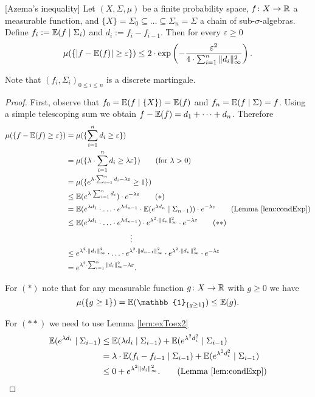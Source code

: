 \begin{lemma}\label{lem:azema}[Azema's inequality]
Let $(X,\Sigma,\mu)$ be a finite probability space, $f\colon X\to\mathbb{R}$ a measurable function, and $\{X\}=\Sigma_0\subseteq\dots\subseteq\Sigma_n=\Sigma$ a chain of sub-$\sigma$-algebras. Define $f_i:=\mathbb{E}(f\mid\Sigma_i)$ and $d_i:=f_i-f_{i-1}$. Then for every $\varepsilon\geq0$
\[\mu(\{|f-\mathbb{E}(f)|\geq \varepsilon\})\leq 2\cdot\exp\left(-\frac{\varepsilon^2}{4\cdot\sum_{i=1}^{n}\|d_i\|^2_\infty}\right).\]
\end{lemma}
Note that $(f_i,\Sigma_i)_{0\leq i\leq n}$ is a discrete martingale. 
\begin{proof} First, observe that $f_0=\mathbb{E}(f\mid \{X\})=\mathbb{E}(f)$ and $f_n=\mathbb{E}(f\mid\Sigma)=f$. Using a simple telescoping sum we obtain $f-\mathbb{E}(f)=d_1+\dots+d_n$. Therefore
\begin{align*}
\mu(\{f-\E(f)\geq \varepsilon\})&=\mu(\{\sum_{i=1}^{n}d_i\geq  \varepsilon\})\\
&=\mu(\{\lambda\cdot\sum_{i=1}^{n}d_i\geq \lambda \varepsilon\})\tag{for $\lambda>0$}\\
&=\mu(\{e^{\lambda\cdot\sum_{i=1}^{n}d_i-\lambda \varepsilon}\geq 1\})\\
&\leq\E(e^{\lambda\cdot\sum_{i=1}^{n}d_i})\cdot e^{-\lambda \varepsilon}\tag{$\ast$}\\
&=\E(e^{\lambda d_1}\cdot\ldots\cdot e^{\lambda d_{n-1}}\cdot\E(e^{\lambda d_n}\mid \Sigma_{n-1}))\cdot e^{-\lambda \varepsilon}\tag{Lemma \ref{lem:condExp}}\\
&\leq\E(e^{\lambda d_1}\cdot\ldots\cdot e^{\lambda d_{n-1}})\cdot e^{\lambda^2\cdot \|d_n\|^2_\infty}\cdot e^{-\lambda \varepsilon}\tag{$\ast\ast$}\\
&\hspace{3cm}\vdots\\
&\leq e^{\lambda^2\cdot \|d_1\|^2_\infty}\cdot\ldots\cdot e^{\lambda^2\cdot \|d_{n-1}\|^2_\infty}\cdot e^{\lambda^2\cdot \|d_n\|^2_\infty}\cdot e^{-\lambda \varepsilon}\\
&=e^{\lambda^2\cdot\sum_{i=1}^n\|d_i\|^2_\infty-\lambda \varepsilon}.
\end{align*}

For $(\ast)$ note that for any measurable function $g\colon X\to\mathbb{R}$ with $g\geq0$ we have %
\[\mu(\{g\geq1\})=\E(\mathbb{1}_{\{g\geq1\}})\leq\E(g).\]

For $(\ast\ast)$ we need to use Lemma \ref{lem:exToex2}
\begin{align*}
\E(e^{\lambda d_i}\mid \Sigma_{i-1})&\leq \E(\lambda d_i\mid\Sigma_{i-1})+\E(e^{\lambda^2 d^2_i}\mid\Sigma_{i-1})\\
&=\lambda\cdot\E( f_i-f_{i-1}\mid\Sigma_{i-1}) + \E(e^{\lambda^2 d^2_i}\mid\Sigma_{i-1})\\
&\leq 0 + e^{\lambda^2 \|d_i\|_\infty^2}.\tag{Lemma \ref{lem:condExp}}
\end{align*}


\end{proof}
